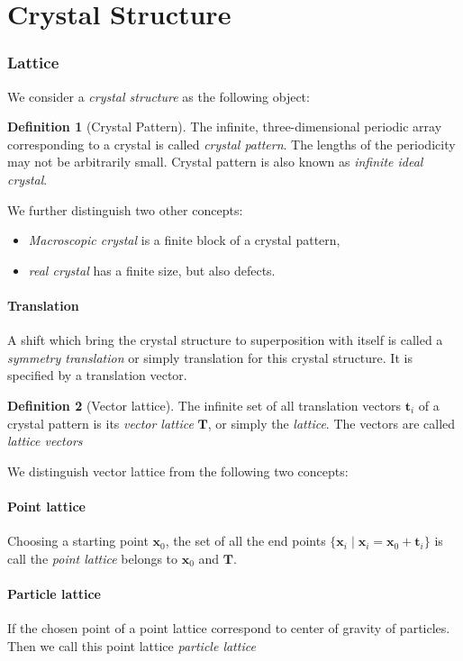 \documentclass{amsart}
\newcommand{\bfx}{\mathbf{x}}
\newcommand{\bft}{\mathbf{t}}
\theoremstyle{remark}
\theoremstyle{remark}
\theoremstyle{definition}
\newtheorem*{definition}{Definition}
\begin{document}
\newpage
\part{Crystal Structure}
\section*{Lattice}
We consider a \emph{crystal structure} as the following object:
\begin{definition}
    [Crystal Pattern]
    The infinite, three-dimensional periodic array corresponding to a crystal is called \emph{crystal pattern}.
    The lengths of the periodicity may not be arbitrarily small. Crystal pattern is also known 
    as \emph{infinite ideal crystal}.
\end{definition}
We further distinguish two other concepts:
\begin{itemize}
    \item \emph{Macroscopic crystal} is a finite block of a crystal pattern,
    \item \emph{real crystal} has a finite size, but also defects.
\end{itemize}

\subsection*{Translation}
A shift which bring the crystal structure to superposition with itself is called 
a \emph{symmetry translation} or simply translation for this crystal structure. 
It is specified by a translation vector.

\begin{definition}
    [Vector lattice]
    The infinite set of all translation vectors $\bft_i$ of a crystal pattern is its \emph{vector lattice} $\mathbf{T}$, 
    or simply the \emph{lattice}. 
    The vectors are called \emph{lattice vectors}
\end{definition}
We distinguish vector lattice from the following two concepts:

\subsection*{Point lattice}
Choosing a starting point $\bfx_0$, the set of all the end points $\{\bfx_i\mid\bfx_i = \bfx_0 + \bft_i\}$
is call the \emph{point lattice} belongs to $\bfx_0$ and $\mathbf{T}$.
\subsection*{Particle lattice}
If the chosen point of a point lattice correspond to center of gravity of particles. Then we call this point lattice \emph{particle lattice}
\end{document}
